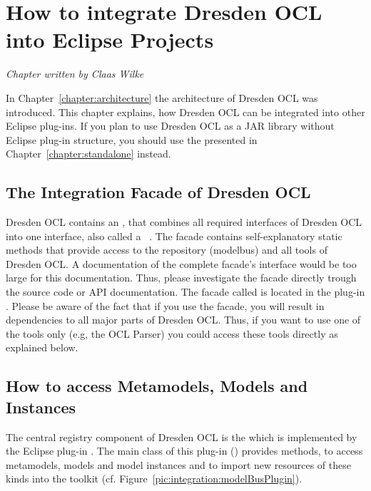 \chapter{How to integrate Dresden OCL into Eclipse Projects}
\label{chapter:integration}

\begin{flushright}
\textit{Chapter written by Claas Wilke}
\end{flushright}

In Chapter~\ref{chapter:architecture} the architecture of Dresden OCL was
introduced. This chapter explains, how Dresden OCL can be integrated into
other Eclipse plug-ins. If you plan to use Dresden OCL as a \acs{JAR} library
without Eclipse plug-in structure, you should use the  presented in Chapter~\ref{chapter:standalone} instead.



\section{The Integration Facade of Dresden OCL}

Dresden OCL contains an , that combines all required
interfaces of Dresden OCL into one interface, also called a
~\cite{gamma:dp}. The facade contains self-explanatory static
methods that provide access to the repository (modelbus) and all tools of
Dresden OCL. A documentation of the complete facade's interface would be too
large for this documentation. Thus, please investigate the facade directly
trough the source code or API documentation. The facade called
 is located in the plug-in
. Please be aware of the fact that if you use the
facade, you will result in dependencies to all major parts of Dresden OCL.
Thus, if you want to use one of the tools only (e.g, the OCL Parser) you could
access these tools directly as explained below.



\section{How to access Metamodels, Models and Instances}

The central registry component of Dresden OCL is the 
which is implemented by the Eclipse plug-in 
. The main class of this plug-in 
() provides methods,
to access metamodels, models and model instances and to import new resources of
these kinds into the toolkit (cf.
Figure~\ref{pic:integration:modelBusPlugin}).

